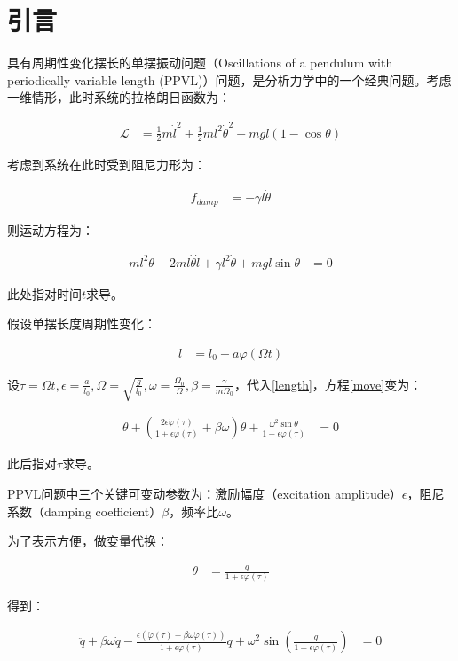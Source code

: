 \section{引言}

具有周期性变化摆长的单摆振动问题（Oscillations of a pendulum with periodically variable length (PPVL)）问题，是分析力学中的一个经典问题\cite{belyakov_nonlinear_2009}。考虑一维情形，此时系统的拉格朗日函数为：

\begin{align}
    \mathcal{L} &= \frac{1}{2}m\dot{l}^{2}+\frac{1}{2}ml^{2}\dot{\theta}^{2}-mgl(1-\cos\theta)
\end{align}

考虑到系统在此时受到阻尼力形为：

\begin{align}
    f_{damp} &= -\gamma l\dot{\theta}
\end{align}

则运动方程为：

\begin{align}
    ml^{2}\ddot{\theta}+2ml\dot{\theta}\dot{l}+\gamma l^{2}\dot{\theta}+mgl\sin\theta &= 0 \label{move}
\end{align}

此处$\dot{}$指对时间$t$求导。

假设单摆长度周期性变化：

\begin{align}
    l &= l_{0} +a\varphi(\Omega t) \label{length}
\end{align}

设$\tau=\Omega t,\epsilon=\frac{a}{l_{0}},\Omega=\sqrt{\frac{g}{l_{0}}},\omega=\frac{\Omega_{0}}{\Omega},\beta=\frac{\gamma}{m\Omega_{0}}$，代入\eqref{length}，方程\eqref{move}变为：

\begin{align}
    \ddot{\theta}+\left(\frac{2\epsilon\dot{\varphi}(\tau)}{1+\epsilon\varphi(\tau)}+\beta\omega\right)\dot{\theta}+\frac{\omega^{2}\sin\theta}{1+\epsilon\varphi(\tau)} &= 0
\end{align}

此后$\dot{}$指对$\tau$求导。

PPVL问题中三个关键可变动参数为：激励幅度（excitation amplitude）$\epsilon$，阻尼系数（damping coefficient）$\beta$，频率比$\omega$。

为了表示方便，做变量代换：

\begin{align}
    \theta &= \frac{q}{1+\epsilon\varphi(\tau)}
\end{align}

得到：

\begin{align}
    \ddot{q}+\beta\omega\dot{q}-\frac{\epsilon(\ddot{\varphi}(\tau)+\beta\omega\dot{\varphi}(\tau))}{1+\epsilon\varphi(\tau)}q+\omega^{2}\sin\left(\frac{q}{1+\epsilon\varphi(\tau)}\right) &= 0 \label{set}
\end{align}